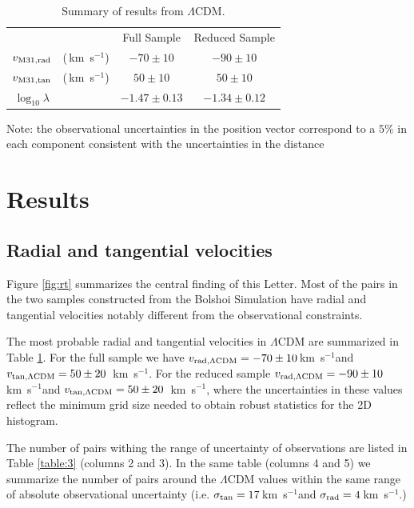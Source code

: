 \documentclass{emulateapj}
\newcommand{\kms}{\,km~s$^{-1}$}
\begin{document}
\begin{table}
\caption{Summary of results from $\Lambda$CDM.}
\begin{center}
\begin{tabular}{cccc}\hline
 &  & Full Sample & Reduced Sample\\
$v_{\rm M31,rad}$ &(\kms) & $-70\pm 10$ & $-90\pm 10$\\
$v_{\rm M31,tan}$ &(\kms) & $50\pm 10$ & $50\pm 10$\\
$\log_{10}\lambda$& & $-1.47\pm 0.13$& $-1.34\pm 0.12$\\\hline
\end{tabular}
\end{center}
\vspace{1mm}
Note: the observational uncertainties in the position vector
correspond to a $5\%$ in each component consistent with the
uncertainties in the distance \citep[see references
  in][]{vanderMarel08} 

\label{table:2}
\end{table}


\section{Results}
\label{sec:results}




\subsection{Radial and tangential velocities}

Figure \ref{fig:rt} summarizes the central finding of this
Letter. Most of the pairs in the two samples constructed from the
Bolshoi Simulation have radial and tangential velocities notably
different from the observational constraints.   

The most probable radial and tangential velocities in $\Lambda$CDM are
summarized in Table \ref{table:2}. For the full sample we have $v_{\rm
  rad,\Lambda CDM} = -70\pm10$\kms and $v_{\rm tan,\Lambda CDM} =
50\pm20$ \kms. For the reduced sample $v_{\rm
  rad,\Lambda CDM} = -90\pm10$\kms and $v_{\rm tan,\Lambda CDM} =
50\pm20$ \kms, where the uncertainties in these values reflect
the minimum grid size needed to obtain robust statistics for the 2D
histogram. 

The number of pairs withing the range of uncertainty of observations
are listed in Table \ref{table:3} (columns 2 and 3). In the same table
(columns 4 and 5) we summarize the number of pairs around the
$\Lambda$CDM values within the same range of absolute observational
uncertainty (i.e. $\sigma_{\rm tan}=17$\kms and $\sigma_{\rm
  rad}=4$\kms.) 
\end{document}
